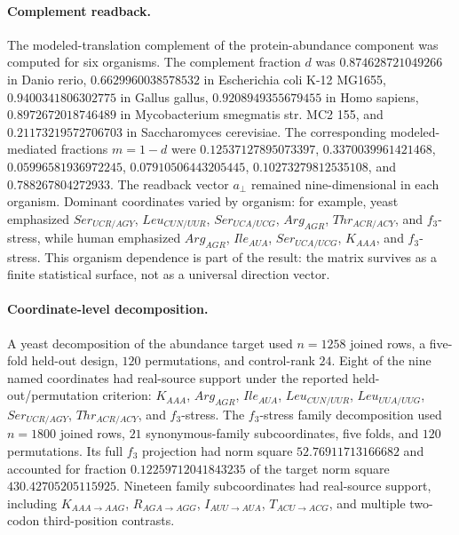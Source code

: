 \paragraph{Complement readback.}
The modeled-translation complement of the protein-abundance component was computed for six organisms.  The complement fraction $d$ was $0.874628721049266$ in Danio rerio, $0.6629960038578532$ in Escherichia coli K-12 MG1655, $0.9400341806302775$ in Gallus gallus, $0.9208949355679455$ in Homo sapiens, $0.8972672018746489$ in Mycobacterium smegmatis str. MC2 155, and $0.21173219572706703$ in Saccharomyces cerevisiae.  The corresponding modeled-mediated fractions $m=1-d$ were $0.12537127895073397$, $0.3370039961421468$, $0.05996581936972245$, $0.07910506443205445$, $0.10273279812535108$, and $0.788267804272933$.  The readback vector $a_\perp$ remained nine-dimensional in each organism.  Dominant coordinates varied by organism: for example, yeast emphasized $Ser_{UCR/AGY}$, $Leu_{CUN/UUR}$, $Ser_{UCA/UCG}$, $Arg_{AGR}$, $Thr_{ACR/ACY}$, and $f_3$-stress, while human emphasized $Arg_{AGR}$, $Ile_{AUA}$, $Ser_{UCA/UCG}$, $K_{AAA}$, and $f_3$-stress.  This organism dependence is part of the result: the matrix survives as a finite statistical surface, not as a universal direction vector.

\paragraph{Coordinate-level decomposition.}
A yeast decomposition of the abundance target used $n=1258$ joined rows, a five-fold held-out design, $120$ permutations, and control-rank $24$.  Eight of the nine named coordinates had real-source support under the reported held-out/permutation criterion: $K_{AAA}$, $Arg_{AGR}$, $Ile_{AUA}$, $Leu_{CUN/UUR}$, $Leu_{UUA/UUG}$, $Ser_{UCR/AGY}$, $Thr_{ACR/ACY}$, and $f_3$-stress.  The $f_3$-stress family decomposition used $n=1800$ joined rows, $21$ synonymous-family subcoordinates, five folds, and $120$ permutations.  Its full $f_3$ projection had norm square $52.76911713166682$ and accounted for fraction $0.12259712041843235$ of the target norm square $430.42705205115925$.  Nineteen family subcoordinates had real-source support, including $K_{AAA\to AAG}$, $R_{AGA\to AGG}$, $I_{AUU\to AUA}$, $T_{ACU\to ACG}$, and multiple two-codon third-position contrasts.

